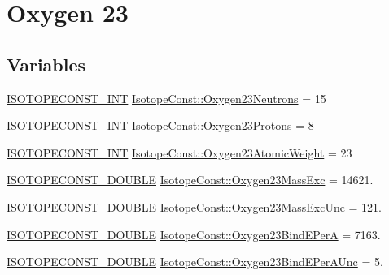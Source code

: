 \hypertarget{group___isotope_const-_oxygen-_o23}{}\section{Oxygen 23}
\label{group___isotope_const-_oxygen-_o23}
\subsection*{Variables}
\begin{DoxyCompactItemize}
\item 
\mbox{\hyperlink{group___isotope_const-_macros_ga5f18360b3e99483a35c32d789e62621c}{I\+S\+O\+T\+O\+P\+E\+C\+O\+N\+S\+T\+\_\+\+I\+NT}} \mbox{\hyperlink{group___isotope_const-_oxygen-_o23_gae89503b74a3cd3c6c871e8c097de8bda}{Isotope\+Const\+::\+Oxygen23\+Neutrons}} = 15
\item 
\mbox{\hyperlink{group___isotope_const-_macros_ga5f18360b3e99483a35c32d789e62621c}{I\+S\+O\+T\+O\+P\+E\+C\+O\+N\+S\+T\+\_\+\+I\+NT}} \mbox{\hyperlink{group___isotope_const-_oxygen-_o23_ga75e557d367ff04ae1cbc48bef1b2df99}{Isotope\+Const\+::\+Oxygen23\+Protons}} = 8
\item 
\mbox{\hyperlink{group___isotope_const-_macros_ga5f18360b3e99483a35c32d789e62621c}{I\+S\+O\+T\+O\+P\+E\+C\+O\+N\+S\+T\+\_\+\+I\+NT}} \mbox{\hyperlink{group___isotope_const-_oxygen-_o23_gabc6a519b5585bc595b5082fe4bcd2880}{Isotope\+Const\+::\+Oxygen23\+Atomic\+Weight}} = 23
\item 
\mbox{\hyperlink{group___isotope_const-_macros_ga8f45a7272ce02c0b4c65c44636ed719a}{I\+S\+O\+T\+O\+P\+E\+C\+O\+N\+S\+T\+\_\+\+D\+O\+U\+B\+LE}} \mbox{\hyperlink{group___isotope_const-_oxygen-_o23_ga8a569dd1b58af038d90e1d3456e13e71}{Isotope\+Const\+::\+Oxygen23\+Mass\+Exc}} = 14621.
\item 
\mbox{\hyperlink{group___isotope_const-_macros_ga8f45a7272ce02c0b4c65c44636ed719a}{I\+S\+O\+T\+O\+P\+E\+C\+O\+N\+S\+T\+\_\+\+D\+O\+U\+B\+LE}} \mbox{\hyperlink{group___isotope_const-_oxygen-_o23_gac48ba5c669edf47096ffacd1b52e638c}{Isotope\+Const\+::\+Oxygen23\+Mass\+Exc\+Unc}} = 121.
\item 
\mbox{\hyperlink{group___isotope_const-_macros_ga8f45a7272ce02c0b4c65c44636ed719a}{I\+S\+O\+T\+O\+P\+E\+C\+O\+N\+S\+T\+\_\+\+D\+O\+U\+B\+LE}} \mbox{\hyperlink{group___isotope_const-_oxygen-_o23_gaa935503a6174f316d1bd1efae0587abc}{Isotope\+Const\+::\+Oxygen23\+Bind\+E\+PerA}} = 7163.
\item 
\mbox{\hyperlink{group___isotope_const-_macros_ga8f45a7272ce02c0b4c65c44636ed719a}{I\+S\+O\+T\+O\+P\+E\+C\+O\+N\+S\+T\+\_\+\+D\+O\+U\+B\+LE}} \mbox{\hyperlink{group___isotope_const-_oxygen-_o23_ga8645949f30e7e1f4326122e893c80314}{Isotope\+Const\+::\+Oxygen23\+Bind\+E\+Per\+A\+Unc}} = 5.

\end{DoxyCompactItemize}
